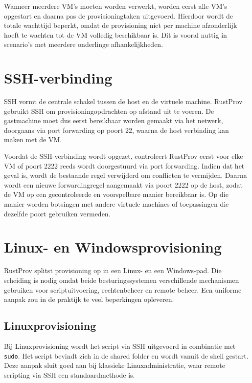 Wanneer meerdere VM's moeten worden verwerkt, worden eerst alle VM's opgestart en daarna pas de provisioningtaken uitgevoerd. Hierdoor wordt de totale wachttijd beperkt, omdat de provisioning niet per machine afzonderlijk hoeft te wachten tot de VM volledig beschikbaar is. Dit is vooral nuttig in scenario's met meerdere onderlinge afhankelijkheden. 

\section{SSH-verbinding}

SSH vormt de centrale schakel tussen de host en de virtuele machine. RustProv gebruikt SSH om provisioningopdrachten op afstand uit te voeren. De gastmachine moet dus eerst bereikbaar worden gemaakt via het netwerk, doorgaans via port forwarding op poort 22, waarna de host verbinding kan maken met de VM. 

Voordat de SSH-verbinding wordt opgezet, controleert RustProv eerst voor elke VM of poort 2222 reeds wordt doorgestuurd via port forwarding. Indien dat het geval is, wordt de bestaande regel verwijderd om conflicten te vermijden. Daarna wordt een nieuwe forwardingregel aangemaakt via poort 2222 op de host, zodat de VM op een gecontroleerde en voorspelbare manier bereikbaar is. Op die manier worden botsingen met andere virtuele machines of toepassingen die dezelfde poort gebruiken vermeden.

\section{Linux- en Windowsprovisioning}

RustProv splitst provisioning op in een Linux- en een Windows-pad. Die scheiding is nodig omdat beide besturingssystemen verschillende mechanismen gebruiken voor scriptuitvoering, rechtenbeheer en remote beheer. Een uniforme aanpak zou in de praktijk te veel beperkingen opleveren. 

\subsection{Linuxprovisioning}

Bij Linuxprovisioning wordt het script via SSH uitgevoerd in combinatie met \texttt{sudo}. Het script bevindt zich in de shared folder en wordt vanuit de shell gestart. Deze aanpak sluit goed aan bij klassieke Linuxadministratie, waar remote scripting via SSH een standaardmethode is.

